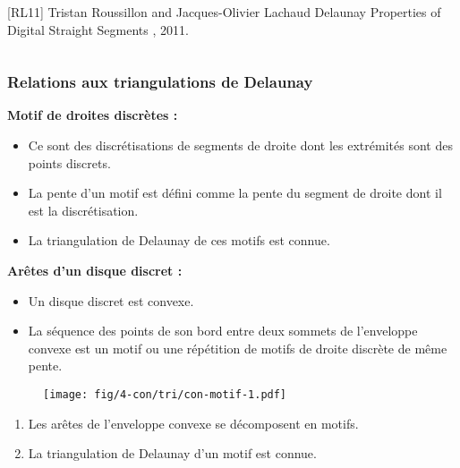 \begin{frame}
\begin{columns}[t]
\begin{column}{0.5\linewidth}
\begin{thebibliography}{alpha}
      [RL11] Tristan Roussillon and Jacques-Olivier Lachaud
      \newblock Delaunay Properties of Digital Straight Segments
      , 2011.
     \end{thebibliography}
    \scriptsize     
  \end{column}
\end{columns}  

\end{frame}

\begin{frame}
\frametitle{Relations aux triangulations de Delaunay}


{
  \begin{block}{}
	\textbf{Motif de droites discrètes :}\\
	\begin{itemize}
    \item Ce sont des discrétisations de segments de droite dont les extrémités sont des points discrets.
    \item La pente d'un motif est défini comme la pente du segment de droite dont il est la discrétisation.
    \item La triangulation de Delaunay de ces motifs est connue.
  \end{itemize}
	
	
	\textbf{Arêtes d'un disque discret :}\\
	\begin{itemize}
    \item Un disque discret est convexe.
    \item La séquence des points de son bord entre deux sommets de l'enveloppe convexe est un motif ou une répétition de motifs de droite discrète de même pente.

  \end{itemize}

  \end{block}
 
	\begin{figure}[H]
	  \centering
	  \texttt{[image: fig/4-con/tri/con-motif-1.pdf]}
	\end{figure}

}

{
  \begin{block}{}
	  \begin{enumerate}
		\item Les arêtes de l'enveloppe convexe se décomposent en motifs.
		\item La triangulation de Delaunay d'un motif est connue.
	  \end{enumerate}
  \end{block}

}
\end{frame}
